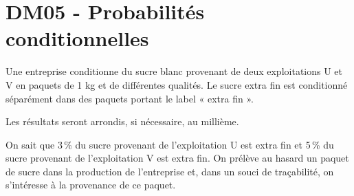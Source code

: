 \documentclass[a4paper,11pt]{article}
\author{Pierquet}
\title{\nomfichier}
\begin{document}
\pagestyle{fancy}

\thispagestyle{entetedm}

\setcounter{numexos}{0}

\part{DM05 - Probabilités conditionnelles}%

\smallskip


\medskip

Une entreprise conditionne du sucre blanc provenant de deux exploitations U et V en paquets de 1 kg et de différentes qualités. Le sucre extra fin est conditionné séparément dans des paquets portant le label « extra fin ».

\smallskip

Les résultats seront arrondis, si nécessaire, au millième.

\smallskip

On sait que 3\,\% du sucre provenant de l’exploitation U est extra fin et 5\,\% du sucre provenant de l’exploitation V est extra fin. On prélève au hasard un paquet de sucre dans la production de l’entreprise et, dans un souci de traçabilité, on s’intéresse à la provenance de ce paquet.

\smallskip
\end{document}

